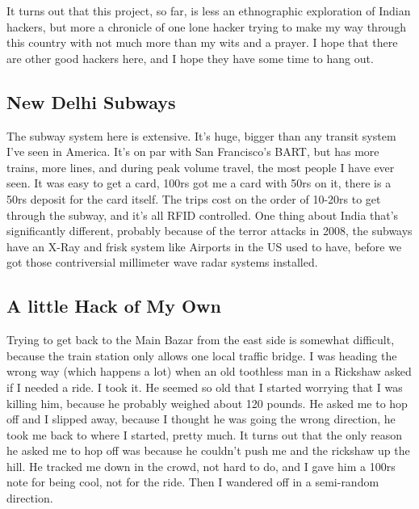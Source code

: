 \documentclass[11pt]{amsart}
\begin{document}
It turns out that this project, so far, is less an ethnographic exploration of Indian hackers, but more a chronicle of one lone hacker trying to make my way through this country with not much more than my wits and a prayer.  I hope that there are other good hackers here, and I hope they have some time to hang out.

\subsection{New Delhi Subways}

The subway system here is extensive. It's huge, bigger than any transit system I've seen in America. It's on par with San Francisco's BART, but has more trains, more lines, and during peak volume travel, the most people I have ever seen. It was easy to get a card, 100rs got me a card with 50rs on it, there is a 50rs deposit for the card itself. The trips cost on the order of 10-20rs to get through the subway, and it's all RFID controlled.  One thing about India that's significantly different, probably because of the terror attacks in 2008, the subways have an X-Ray and frisk system like Airports in the US used to have, before we got those contriversial millimeter wave radar systems installed.

\subsection{A little Hack of My Own}

Trying to get back to the Main Bazar from the east side is somewhat difficult, because the train station only allows one local traffic bridge. I was heading the wrong way (which happens a lot) when an old toothless man in a Rickshaw asked if I needed a ride. I took it. He seemed so old that I started worrying that I was killing him, because he probably weighed about 120 pounds. He asked me to hop off and I slipped away, because I thought he was going the wrong direction, he took me back to where I started, pretty much. It turns out that the only reason he asked me to hop off was because he couldn't push me and the rickshaw up the hill. He tracked me down in the crowd, not hard to do, and I gave him a 100rs note for being cool, not for the ride. Then I wandered off in a semi-random direction.
\end{document}
